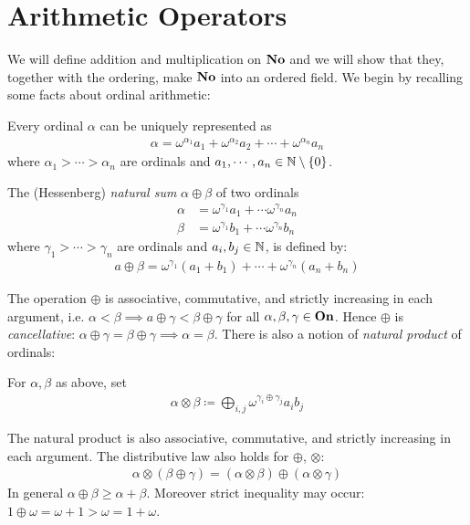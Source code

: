 \section{Arithmetic Operators}
We will define addition and multiplication on $\mathbf{No}$ and we will 
show that they, together with the ordering, make $\mathbf{No}$ into 
an ordered field. 
We begin by recalling some facts about ordinal arithmetic: 
\begin{theorem}
	Every ordinal $\alpha$ can be uniquely represented as
	\begin{align*}
		\alpha = \omega^{\alpha_1} a_1 + \omega^{\alpha_2}
		a_2 + \cdots + \omega^{\alpha_n} a_n
	\end{align*}
	where $\alpha_1 > \cdots > \alpha_n$ are ordinals and 
	$a_1, \cdots, a_n \in \mathbb{N} \setminus \left\{ 0 \right\}$. 
	\label{}
\end{theorem}
\begin{defn}
	The (Hessenberg) \emph{natural sum} $\alpha \oplus \beta$ of 
	two ordinals
	\begin{align*}
		\alpha &= \omega^{\gamma_1} a_1 + \cdots \omega^{\gamma_n}
		a_n \\
		\beta &= \omega^{\gamma_1} b_1 + \cdots \omega^{\gamma_n} 
		b_n
	\end{align*}
	where $\gamma_1 > \cdots > \gamma_n$ are ordinals and 
	$a_i, b_j \in \mathbb{N}$, is defined by: 
	\begin{align*}
		a \oplus \beta = \omega^{\gamma_1}(a_1 + b_1) + \cdots 
		+ \omega^{\gamma_n}(a_n + b_n)
	\end{align*}
\end{defn}
The operation $\oplus$ is associative, commutative, and strictly increasing 
in each argument, i.e. $\alpha < \beta \implies a \oplus \gamma < \beta \oplus 
\gamma$ for all $\alpha, \beta, \gamma \in \mathbf{On}$. Hence 
$\oplus$ is \emph{cancellative}: $\alpha \oplus \gamma = \beta \oplus 
\gamma \implies \alpha = \beta$. There is also a notion of 
\emph{natural product} of ordinals: 
\begin{defn}
	For $\alpha, \beta$ as above, set 
	\begin{align*}
		\alpha \otimes \beta \coloneq 
		\bigoplus_{i, j}{\omega^{\gamma_i \oplus \gamma_j}a_i 
	b_j}
	\end{align*}
\end{defn}
The natural product is also associative, commutative, and strictly 
increasing in each argument. The distributive law also holds for 
$\oplus$, $\otimes$: 
\begin{align*}
	\alpha \otimes (\beta \oplus \gamma) = (\alpha \otimes \beta) 
	\oplus (\alpha \otimes \gamma)
\end{align*}
In general $\alpha \oplus \beta \geq \alpha + \beta$. Moreover 
strict inequality may occur: $1 \oplus \omega = \omega + 1 > \omega = 
1 + \omega$. 

